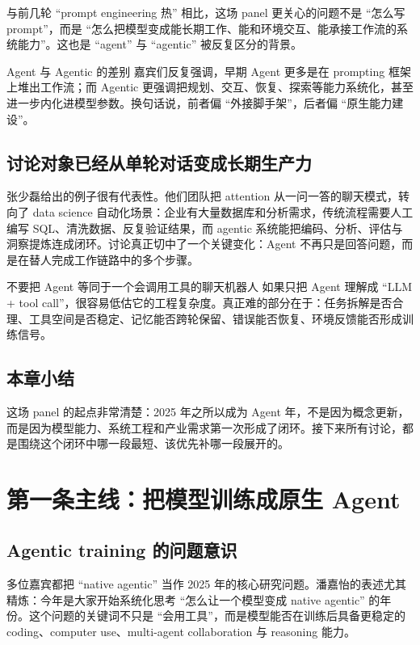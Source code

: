 \documentclass[a4paper]{article}
\begin{document}
与前几轮 ``prompt engineering 热'' 相比，这场 panel 更关心的问题不是 ``怎么写 prompt''，而是 ``怎么把模型变成能长期工作、能和环境交互、能承接工作流的系统能力''。这也是 ``agent'' 与 ``agentic'' 被反复区分的背景。

\begin{knowledgebox}{Agent 与 Agentic 的差别}
嘉宾们反复强调，早期 Agent 更多是在 prompting 框架上堆出工作流；而 Agentic 更强调把规划、交互、恢复、探索等能力系统化，甚至进一步内化进模型参数。换句话说，前者偏 ``外接脚手架''，后者偏 ``原生能力建设''。
\end{knowledgebox}

\subsection{讨论对象已经从单轮对话变成长期生产力}
张少磊给出的例子很有代表性。他们团队把 attention 从一问一答的聊天模式，转向了 data science 自动化场景：企业有大量数据库和分析需求，传统流程需要人工编写 SQL、清洗数据、反复验证结果，而 agentic 系统能把编码、分析、评估与洞察提炼连成闭环。讨论真正切中了一个关键变化：Agent 不再只是回答问题，而是在替人完成工作链路中的多个步骤。

\begin{warningbox}{不要把 Agent 等同于一个会调用工具的聊天机器人}
如果只把 Agent 理解成 ``LLM + tool call''，很容易低估它的工程复杂度。真正难的部分在于：任务拆解是否合理、工具空间是否稳定、记忆能否跨轮保留、错误能否恢复、环境反馈能否形成训练信号。
\end{warningbox}

\subsection{本章小结}
这场 panel 的起点非常清楚：2025 年之所以成为 Agent 年，不是因为概念更新，而是因为模型能力、系统工程和产业需求第一次形成了闭环。接下来所有讨论，都是围绕这个闭环中哪一段最短、该优先补哪一段展开的。

\section{第一条主线：把模型训练成原生 Agent}

\subsection{Agentic training 的问题意识}
多位嘉宾都把 ``native agentic'' 当作 2025 年的核心研究问题。潘嘉怡的表述尤其精炼：今年是大家开始系统化思考 ``怎么让一个模型变成 native agentic'' 的年份。这个问题的关键词不只是 ``会用工具''，而是模型能否在训练后具备更稳定的 coding、computer use、multi-agent collaboration 与 reasoning 能力。
\end{document}
